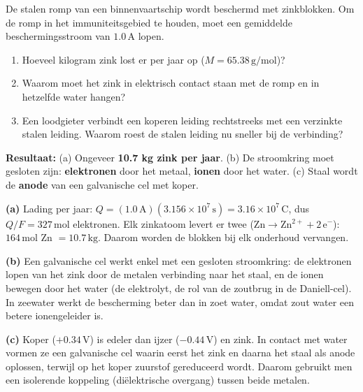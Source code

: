 \begin{oefening}
De stalen romp van een binnenvaartschip wordt beschermd met zinkblokken. Om de romp in het immuniteitsgebied te houden, moet een gemiddelde beschermingsstroom van \(1.0\,\mathrm{A}\) lopen.

\begin{enumerate}
\item[(a)]
  Hoeveel kilogram zink lost er per jaar op (\(M = 65.38\,\mathrm{g/mol}\))?
\item[(b)]
  Waarom moet het zink in elektrisch contact staan met de romp en in hetzelfde water hangen?
\item[(c)]
  Een loodgieter verbindt een koperen leiding rechtstreeks met een verzinkte stalen leiding. Waarom roest de stalen leiding nu sneller bij de verbinding?
\end{enumerate}
\end{oefening}
\begin{oplossing}
\textbf{Resultaat:} (a) Ongeveer \textbf{10.7 kg zink per jaar}. (b) De stroomkring moet gesloten zijn: \textbf{elektronen} door het metaal, \textbf{ionen} door het water. (c) Staal wordt de \textbf{anode} van een galvanische cel met koper.

\textbf{(a)} Lading per jaar: \(Q = (1.0\,\mathrm{A})(3.156\times10^{7}\,\mathrm{s}) = 3.16\times10^{7}\,\mathrm{C}\), dus \(Q/F = 327\,\mathrm{mol}\) elektronen. Elk zinkatoom levert er twee (\(\mathrm{Zn \rightarrow Zn^{2+} + 2\,e^-}\)): \(164\,\mathrm{mol}\) Zn \(= 10.7\,\mathrm{kg}\). Daarom worden de blokken bij elk onderhoud vervangen.

\textbf{(b)} Een galvanische cel werkt enkel met een gesloten stroomkring: de elektronen lopen van het zink door de metalen verbinding naar het staal, en de ionen bewegen door het water (de elektrolyt, de rol van de zoutbrug in de Daniell-cel). In zeewater werkt de bescherming beter dan in zoet water, omdat zout water een betere ionengeleider is.

\textbf{(c)} Koper (\(+0.34\,\mathrm{V}\)) is edeler dan ijzer (\(-0.44\,\mathrm{V}\)) en zink. In contact met water vormen ze een galvanische cel waarin eerst het zink en daarna het staal als anode oplossen, terwijl op het koper zuurstof gereduceerd wordt. Daarom gebruikt men een isolerende koppeling (diëlektrische overgang) tussen beide metalen.
\end{oplossing}

